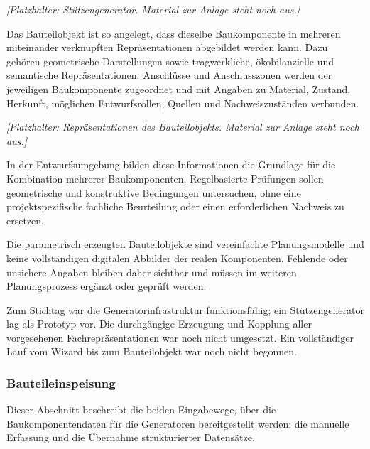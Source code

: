 \documentclass[type=zwischenbericht,theme=dark]{zukunftbau}
\begin{document}
\begin{Figure}[title=Stützengenerator]
\textit{[Platzhalter: Stützengenerator. Material zur Anlage steht noch aus.]}
\end{Figure}

Das Bauteilobjekt ist so angelegt, dass dieselbe Baukomponente in mehreren miteinander verknüpften Repräsentationen abgebildet werden kann. Dazu gehören geometrische Darstellungen sowie tragwerkliche, ökobilanzielle und semantische Repräsentationen. Anschlüsse und Anschlusszonen werden der jeweiligen Baukomponente zugeordnet und mit Angaben zu Material, Zustand, Herkunft, möglichen Entwurfsrollen, Quellen und Nachweiszuständen verbunden.

\begin{Figure}[title=Repräsentationen des Bauteilobjekts]
\textit{[Platzhalter: Repräsentationen des Bauteilobjekts. Material zur Anlage steht noch aus.]}
\end{Figure}

In der Entwurfsumgebung bilden diese Informationen die Grundlage für die Kombination mehrerer Baukomponenten. Regelbasierte Prüfungen sollen geometrische und konstruktive Bedingungen untersuchen, ohne eine projektspezifische fachliche Beurteilung oder einen erforderlichen Nachweis zu ersetzen.

Die parametrisch erzeugten Bauteilobjekte sind vereinfachte Planungsmodelle und keine vollständigen digitalen Abbilder der realen Komponenten. Fehlende oder unsichere Angaben bleiben daher sichtbar und müssen im weiteren Planungsprozess ergänzt oder geprüft werden.

Zum Stichtag war die Generatorinfrastruktur funktionsfähig; ein Stützengenerator lag als Prototyp vor. Die durchgängige Erzeugung und Kopplung aller vorgesehenen Fachrepräsentationen war noch nicht umgesetzt. Ein vollständiger Lauf vom Wizard bis zum Bauteilobjekt war noch nicht begonnen.

\subsubsection{Bauteileinspeisung}
Dieser Abschnitt beschreibt die beiden Eingabewege, über die Baukomponentendaten für die Generatoren bereitgestellt werden: die manuelle Erfassung und die Übernahme strukturierter Datensätze.
\end{document}
